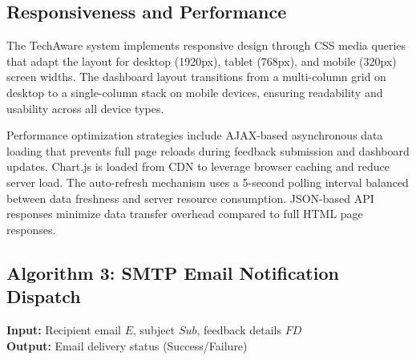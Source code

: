 \subsection{Responsiveness and Performance}

The TechAware system implements responsive design through CSS media queries that adapt the layout for desktop (1920px), tablet (768px), and mobile (320px) screen widths. The dashboard layout transitions from a multi-column grid on desktop to a single-column stack on mobile devices, ensuring readability and usability across all device types.

Performance optimization strategies include AJAX-based asynchronous data loading that prevents full page reloads during feedback submission and dashboard updates. Chart.js is loaded from CDN to leverage browser caching and reduce server load. The auto-refresh mechanism uses a 5-second polling interval balanced between data freshness and server resource consumption. JSON-based API responses minimize data transfer overhead compared to full HTML page responses.



\subsection{Algorithm 3: SMTP Email Notification Dispatch}

\textbf{Input:} Recipient email $E$, subject $Sub$, feedback details $FD$ \\
\textbf{Output:} Email delivery status (Success/Failure)


